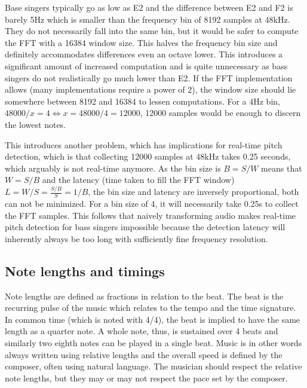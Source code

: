 Base singers typically go as low as E2 and the difference between E2 and F2 is barely 5Hz which is smaller than the frequency bin of 8192 samples at 48kHz. They do not necessarily fall into the same bin, but it would be safer to compute the FFT with a 16384 window size. This halves the frequency bin size and definitely accommodates differences even an octave lower. This introduces a significant amount of increased computation and is quite unnecessary as bass singers do not realistically go much lower than E2. If the FFT implementation allows (many implementations require a power of 2), the window size should lie somewhere between 8192 and 16384 to lessen computations. For a 4Hz bin, $48000/x = 4 \iff x = 48000/4 = 12000$, 12000 samples would be enough to discern the lowest notes. 

This introduces another problem, which has implications for real-time pitch detection, which is that collecting 12000 samples at 48kHz takes 0.25 seconds, which arguably is not real-time anymore. As the bin size is $B = S/W$ means that $W = S/B$ and the latency (time taken to fill the FFT window) $L = W/S = \frac{S/B}{S} = 1/B$, the bin size and latency are inversely proportional, both can not be minimized. For a bin size of 4, it will necessarily take 0.25s to collect the FFT samples. This follows that naively transforming audio makes real-time pitch detection for bass singers impossible because the detection latency will inherently always be too long with sufficiently fine frequency resolution.

\subsection{Note lengths and timings}
Note lengths are defined as fractions in relation to the beat. The beat is the recurring pulse of the music which relates to the tempo and the time signature. In common time (which is noted with 4/4), the beat is implied to have the same length as a quarter note. A whole note, thus, is sustained over 4 beats and similarly two eighth notes can be played in a single beat. Music is in other words always written using relative lengths and the overall speed is defined by the composer, often using natural language. The musician should respect the relative note lengths, but they may or may not respect the pace set by the composer.  

